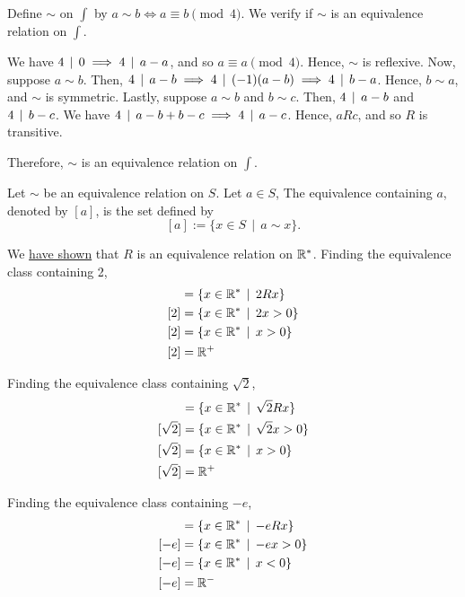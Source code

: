     \begin{example}
        Define \(\sim\) on \(\int\) by \(a \sim b \iff a \equiv b \pmod{4}\). We verify if \(\sim\) is an equivalence relation on \(\int\).
        
        We have \(4\,\mid\, 0 \implies 4\,\mid\, a - a\), and so \(a \equiv a \pmod{4}\). Hence, \(\sim\) is reflexive. Now, suppose \(a \sim b\). Then, \(4 \,\mid\, a - b \implies 4 \,\mid\, (-1)(a - b) \implies 4 \,\mid\, b - a\). Hence, \(b \sim a\), and \(\sim\) is symmetric. Lastly, suppose \(a \sim b\) and \(b \sim c\). Then, \(4\,\mid\, a - b\) and \(4 \,\mid\, b - c\). We have \(4 \,\mid\, a - b + b - c \implies 4 \,\mid\, a - c\). Hence, \(aRc\), and so \(R\) is transitive.
        
        Therefore, \(\sim\) is an equivalence relation on \(\int\).
    \end{example}

    \begin{dfn}
        Let \(\sim\) be an equivalence relation on \(S\). Let \(a\in S\), The equivalence containing \(a\), denoted by \([a]\), is the set defined by \[[a] := \{x\in S \,\mid\, a \sim x\}.\]
    \end{dfn}

    \begin{example}
        We \hyperref[exm:equivR]{have shown} that \(R\) is an equivalence relation on \(\mathbb{R}^*\). Finding the equivalence class containing 2,
        \begin{align*}
            [2] &= \{x\in\real^* \,\mid\, 2Rx\} \\
            [2] &= \{x\in\real^* \,\mid\, 2x > 0\} \\
            [2] &= \{x\in\real^* \,\mid\, x > 0\} \\
            [2] &= \real^+
        \end{align*}

        Finding the equivalence class containing \(\sqrt{2}\),
        \begin{align*}
            [\sqrt{2}] &= \{x\in\real^* \,\mid\, \sqrt{2}Rx\} \\
            [\sqrt{2}] &= \{x\in\real^* \,\mid\, \sqrt{2}x > 0\} \\
            [\sqrt{2}] &= \{x\in\real^* \,\mid\, x > 0\} \\
            [\sqrt{2}] &= \real^+
        \end{align*}

        Finding the equivalence class containing \(-e\),
        \begin{align*}
            [-e] &= \{x\in\real^* \,\mid\, -eRx\} \\
            [-e] &= \{x\in\real^* \,\mid\, -ex > 0\} \\
            [-e] &= \{x\in\real^* \,\mid\, x < 0\} \\
            [-e] &= \real^-
        \end{align*}
    \end{example}

